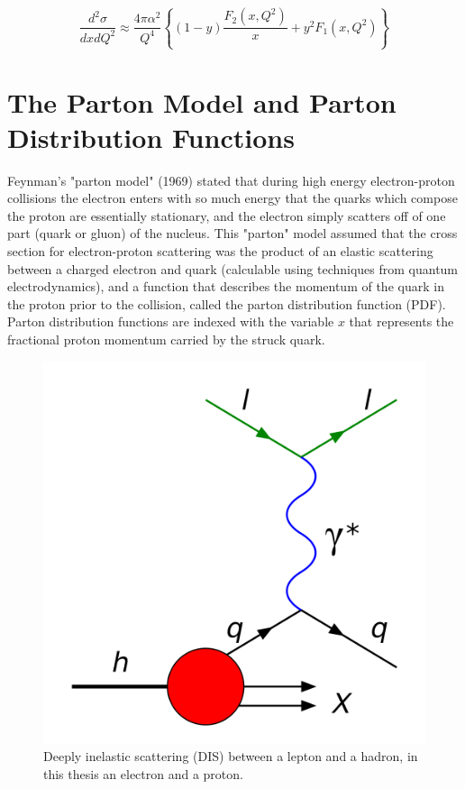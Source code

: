 \begin{equation}
	\label{eqn:sfs2}
	\frac{d^2\sigma}{dx dQ^2} \approx \frac{4 \pi \alpha^2}{Q^4} \left\lbrace \left( 1 - y \right) \frac{F_2(x,Q^2)}{x} + y^2 F_1 (x,Q^2) \right\rbrace
\end{equation}

\section{The Parton Model and Parton Distribution Functions}
Feynman's "parton model" (1969) stated that during high energy electron-proton collisions the electron enters with so much energy that the quarks which compose the proton are essentially stationary, and the electron simply scatters off of one part (quark or gluon) of the nucleus.  This "parton" model assumed that the cross section for electron-proton scattering was the product of an elastic scattering between a charged electron and quark (calculable using techniques from quantum electrodynamics), and a function that describes the momentum of the quark in the proton prior to the collision, called the parton distribution function (PDF).  Parton distribution functions are indexed with the variable $x$ that represents the fractional proton momentum carried by the struck quark.  

\begin{figure}
	\centering
	\label{fig:dis}
	\includegraphics[width = \textwidth]{image/diagrams/dis.png}	
	\caption[A diagrammatic representation of deeply inelastic scattering.]{Deeply inelastic scattering (DIS) between a lepton and a hadron, in this thesis an electron and a proton.}
\end{figure}

